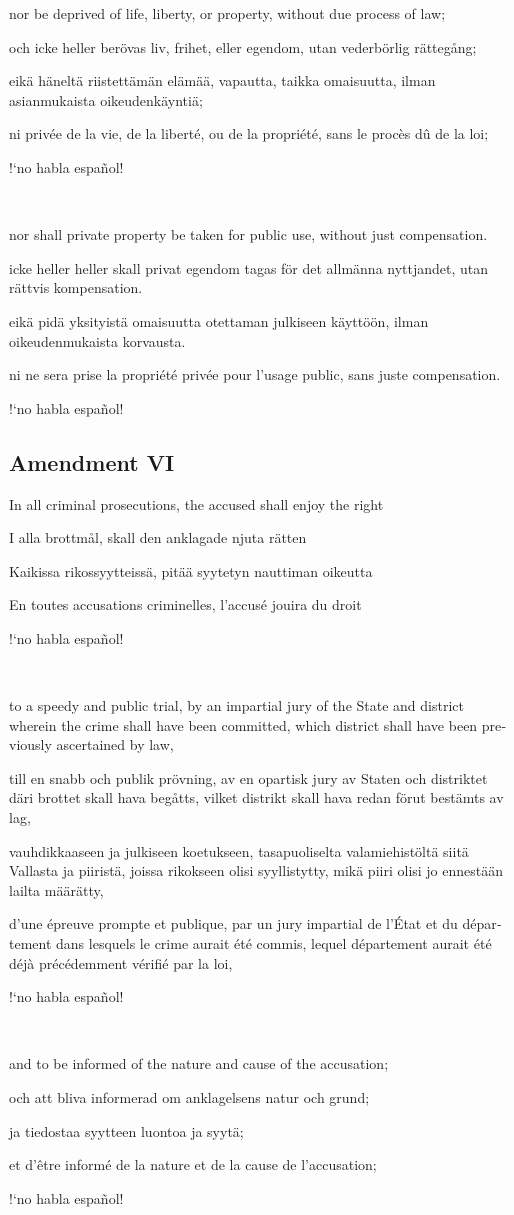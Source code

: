 \documentclass[a4paper,landscape,10pt]{article}
\newcommand{\tblock}[5]{\noindent\begin{minipage}[t]{0.18\textwidth}\foreignlanguage{english}{#1}\end{minipage}\hskip 0.025\textwidth\begin{minipage}[t]{0.18\textwidth}\foreignlanguage{swedish}{#2}\end{minipage}\hskip 0.025\textwidth\begin{minipage}[t]{0.18\textwidth}\foreignlanguage{finnish}{#3}\end{minipage}\hskip 0.025\textwidth\begin{minipage}[t]{0.18\textwidth}\foreignlanguage{french}{#4}\end{minipage}\hskip 0.025\textwidth\begin{minipage}[t]{0.18\textwidth}\foreignlanguage{spanish}{#5}\end{minipage}}
\begin{document}
\tblock
{nor be deprived of life, liberty, or property, without due process of law;}
{och icke heller berövas liv, frihet, eller egendom, utan vederbörlig rättegång;}
{eikä häneltä riistettämän elämää, vapautta, taikka omaisuutta, ilman asianmukaista oikeudenkäyntiä;}
{ni privée de la vie, de la liberté, ou de la propriété, sans le procès dû de la loi;}
{!`no habla español!}

~

\tblock
{nor shall private property be taken for public use, without just compensation.}
{icke heller heller skall privat egendom tagas för det allmänna nyttjandet, utan rättvis kompensation.}
{eikä pidä yksityistä omaisuutta otettaman julkiseen käyttöön, ilman oikeudenmukaista korvausta.}
{ni ne sera prise la propriété privée pour l'usage public, sans juste compensation.}
{!`no habla español!}


\subsection*{Amendment VI}
\tblock
{In all criminal prosecutions, the accused shall enjoy the right}
{I alla brottmål, skall den anklagade njuta rätten}
{Kaikissa rikossyytteissä, pitää syytetyn nauttiman oikeutta}
{En toutes accusations criminelles, l'accusé jouira du droit}
{!`no habla español!}

~

\tblock
{to a speedy and public trial, by an impartial jury of the State and district wherein the crime shall have been committed, which district shall have been previously ascertained by law,}
{till en snabb och publik prövning, av en opartisk jury av Staten och distriktet däri brottet skall hava begåtts, vilket distrikt skall hava redan förut bestämts av lag,}
{vauhdikkaaseen ja julkiseen koetukseen, tasapuoliselta valamiehistöltä siitä Vallasta ja piiristä, joissa rikokseen olisi syyllistytty, mikä piiri olisi jo ennestään lailta määrätty,}
{d'une épreuve prompte et publique, par un jury impartial de l'État et du département dans lesquels le crime aurait été commis, lequel département aurait été déjà précédemment vérifié par la loi,}
{!`no habla español!}

~

\tblock
{and to be informed of the nature and cause of the accusation;}
{och att bliva informerad om anklagelsens natur och grund;}
{ja tiedostaa syytteen luontoa ja syytä;}
{et d'être informé de la nature et de la cause de l'accusation;}
{!`no habla español!}
\end{document}
